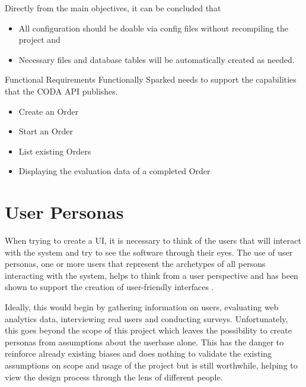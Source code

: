 Directly from the main objectives, it can be concluded that
\begin{itemize}
\item	All configuration should be doable via config files without recompiling the project and
\item	Necessary files and database tables will be automatically created as needed.
\end{itemize}
Functional Requirements
Functionally Sparked needs to support the capabilities that the CODA API publishes. 
\begin{itemize}
\item	Create an Order
\item	Start an Order
\item	List existing Orders
\item	Displaying the evaluation data of a completed Order
\end{itemize}























\section{User Personas}
When trying to create a UI, it is necessary to think of the users that will interact with the system and try to see the software through their eyes. The use of user personas, one or more users that represent the archetypes of all persons interacting with the system, helps to think from a user perspective and has been shown to support the creation of user-friendly interfaces \cite{long2009real}. 

Ideally, this would begin by gathering information on users, evaluating web analytics data, interviewing real users and conducting surveys. Unfortunately, this goes beyond the scope of this project which leaves the possibility to create personas from assumptions about the userbase alone. This has the danger to reinforce already existing biases and does nothing to validate the existing assumptions on scope and usage of the project but is still worthwhile, helping to view the design process through the lens of different people.

